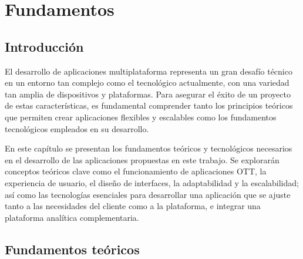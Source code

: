 \chapter{Fundamentos}
\label{chap:fundamentos}

\section{Introducción}
\label{sec:introduccion_fundamentos}
El desarrollo de aplicaciones multiplataforma representa un gran desafío técnico en un entorno
tan complejo como el tecnológico actualmente, con una variedad tan amplia de dispositivos y plataformas.
Para asegurar el éxito de un proyecto de estas características, es fundamental comprender tanto los principios 
teóricos que permiten crear aplicaciones flexibles y escalables como los fundamentos tecnológicos empleados 
en su desarrollo.

En este capítulo se presentan los fundamentos teóricos y tecnológicos necesarios en el desarrollo de 
las aplicaciones propuestas en este trabajo. Se explorarán conceptos teóricos clave como el funcionamiento 
de aplicaciones OTT, la experiencia de usuario, el diseño de interfaces, la adaptabilidad y la escalabilidad; 
así como las tecnologías esenciales para desarrollar una aplicación que se ajuste tanto a las necesidades del 
cliente como a la plataforma, e integrar una plataforma analítica complementaria.

\section{Fundamentos teóricos}
\label{sec:fundamentos_teoricos}